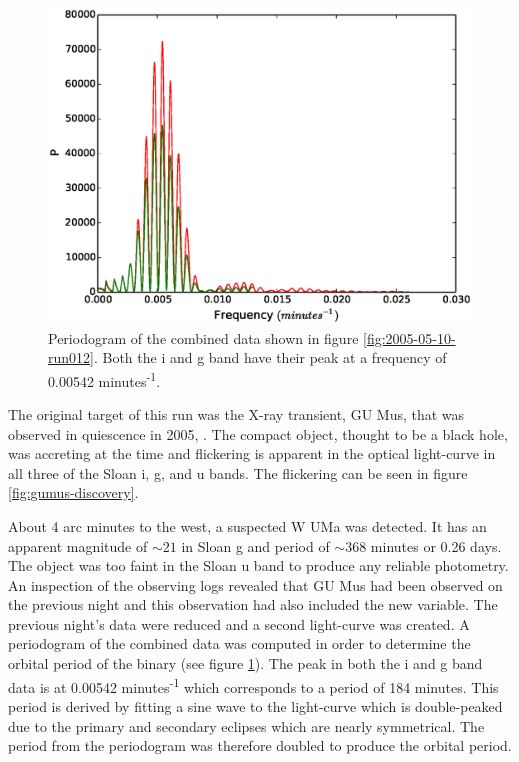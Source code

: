 \begin{figure}
     \center
     \includegraphics[width=120mm]{images/2005-05-10-pgram-bin16.eps} 
     \caption{Periodogram of the combined data shown in figure \ref{fig:2005-05-10-run012}. Both the i and g band have their peak at a frequency of 0.00542 minutes\textsuperscript{-1}.}
     \label{fig:2005-05-10-pgram}
   \end{figure}

  
The original target of this run was the X-ray transient, {GU Mus}, that was observed in quiescence in 2005, \citep{tariq2010}. The compact object, thought to be a black hole, was accreting at the time and flickering is apparent in the optical light-curve in all three of the Sloan i, g, and u bands. The flickering can be seen in figure \ref{fig:gumus-discovery}. 

About 4 arc minutes to the west, a suspected {W UMa} was detected. It has an apparent magnitude of $\sim21$ in Sloan g and period of $\sim 368$ minutes or 0.26 days. The object was too faint in the Sloan u band to produce any reliable photometry. An inspection of the observing logs revealed that GU Mus had been observed on the previous night and this observation had also included the new variable. The previous night's data were reduced and a second light-curve was created. A periodogram of the combined data  was computed in order to determine the orbital period of the binary (see figure \ref{fig:2005-05-10-pgram}). The peak in both the i and g band data is at 0.00542 minutes\textsuperscript{-1} which corresponds to a period of 184 minutes. This period is derived by fitting a sine wave to the light-curve which is double-peaked due to the primary and secondary eclipses which are nearly symmetrical. The period from the periodogram was therefore doubled to produce the orbital period. 

